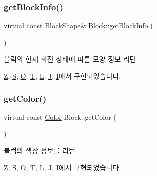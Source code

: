 \subsubsection{\texorpdfstring{get\+Block\+Info()}{getBlockInfo()}}
{\footnotesize\ttfamily virtual const \mbox{\hyperlink{class_block_aca5d951639f113e2ebd7856209d6b9ab}{Block\+Shape}}\& Block\+::get\+Block\+Info (\begin{DoxyParamCaption}{ }\end{DoxyParamCaption})\hspace{0.3cm}{\ttfamily [pure virtual]}}



블럭의 현재 회전 상태에 따른 모양 정보 리턴 



\mbox{\hyperlink{class_z_a95cca7076b1d1744d099f2a7db67fbf1}{Z}}, \mbox{\hyperlink{class_s_aedd52f4a59ed94415945a54e0a1a477b}{S}}, \mbox{\hyperlink{class_o_a608161f6603f07da95a9d26ac7f0cacb}{O}}, \mbox{\hyperlink{class_t_a7c4343dcdc6e48c8413e2d582cdbcea9}{T}}, \mbox{\hyperlink{class_l_a15b15422c8c61bda876d5a7ca68e7347}{L}}, \mbox{\hyperlink{class_j_a2ef290578088ff6206767f6624748284}{J}}, \mbox{\hyperlink{class_i_a21f835547d478a560c6616d8ca81e966}{I}}에서 구현되었습니다.

\mbox{\label{class_block_af10efef648f21dc708e42e149cd6fbcf}} 
\subsubsection{\texorpdfstring{get\+Color()}{getColor()}}
{\footnotesize\ttfamily virtual const \mbox{\hyperlink{class_block_ad054b4ac51df79aa910040b2a2fdf7b5}{Color}} Block\+::get\+Color (\begin{DoxyParamCaption}{ }\end{DoxyParamCaption})\hspace{0.3cm}{\ttfamily [pure virtual]}}



블럭의 색상 정보를 리턴 



\mbox{\hyperlink{class_z_a75f1e882dd5fb52b23bbd691da1e306e}{Z}}, \mbox{\hyperlink{class_s_a6b0a59fa5ae754544d2ad1c250f8dece}{S}}, \mbox{\hyperlink{class_o_a2ffa14a52f6fa0f6964f25f75e2909ad}{O}}, \mbox{\hyperlink{class_t_a1aebf9e5cf8cf319810b09cc5c619157}{T}}, \mbox{\hyperlink{class_l_a059120e541b527394d832e5994659652}{L}}, \mbox{\hyperlink{class_j_a9055b5b54907c2fe1b9973cd74fc9c3e}{J}}, \mbox{\hyperlink{class_i_afa15b62959b0207778d0db1763aff784}{I}}에서 구현되었습니다.


